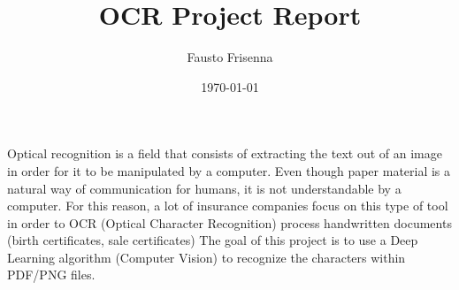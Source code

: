 \documentclass[fontsize=12pt, paper=book, DIV=calc]{scrbook}
\title{OCR Project Report}
\author{Fausto Frisenna}
\date{\today}
\begin{document}
\maketitle

\tableofcontents
\newpage
Optical recognition is a field that consists of extracting the text out of an image in order for it to be manipulated by a computer. Even though paper material is a natural way of communication for humans, it is not understandable by a computer. For this reason, a lot of insurance companies focus on this type of tool in order to OCR (Optical Character Recognition) process handwritten documents (birth certificates, sale certificates)
The goal of this project is to use a Deep Learning algorithm (Computer Vision) to recognize the characters within PDF/PNG files.

\printbibliography
\end{document}
